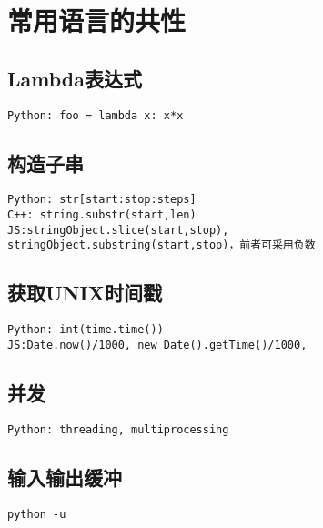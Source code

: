 \section{常用语言的共性}


\subsection{Lambda表达式}
\begin{verbatim}
Python: foo = lambda x: x*x
\end{verbatim}


\subsection{构造子串}
\begin{verbatim}
Python: str[start:stop:steps]
C++: string.substr(start,len)
JS:stringObject.slice(start,stop), stringObject.substring(start,stop)，前者可采用负数
\end{verbatim}

\subsection{获取UNIX时间戳}
\begin{verbatim}
Python: int(time.time())
JS:Date.now()/1000, new Date().getTime()/1000, 
\end{verbatim}

\subsection{并发}

\begin{verbatim}
Python: threading, multiprocessing
\end{verbatim}

\subsection{输入输出缓冲}
\begin{verbatim}
python -u
\end{verbatim}


